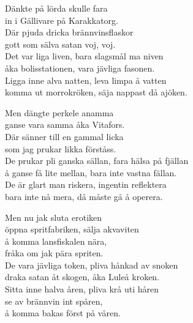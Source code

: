 \vspace{10pt}
Dänkte på lörda skulle fara\\
in i Gällivare på Karakkatorg.\\
Där pjuda dricka brännvinsflaskor\\
gott som sälva satan voj, voj.\\
Det var liga liven, bara slagsmål ma niven\\
åka bolisstationen, vara jävliga fasonen.\\
Ligga inne alva natten, leva limpa å vatten\\
komma ut morrokröken, säja nappast då ajöken.\par
\vspace{10pt}
Men dängte perkele anamma\\
ganse vara samma åka Vitafors.\\
Där sänner till en gammal licka\\
som jag prukar likka förståss.\\
De prukar pli ganska sällan, fara hälsa på fjällan\\
å ganse få lite mellan, bara inte vastna fällan.\\
De är glart man riskera, ingentin reflektera\\
bara inte nå mera, då måste gå å operera.\par
\vspace{10pt}
Men nu jak sluta erotiken\\
öppna spritfabriken, sälja akvaviten\\
å komma lansfiskalen nära,\\
fråka om jak pära spriten.\\
De vara jävliga token, pliva hånkad av snoken\\
draka satan åt skogen, åka Luleå kroken.\\
Sitta inne halva åren, pliva krå uti håren\\
se av brännvin int spåren,\\
å komma bakas först på våren.
